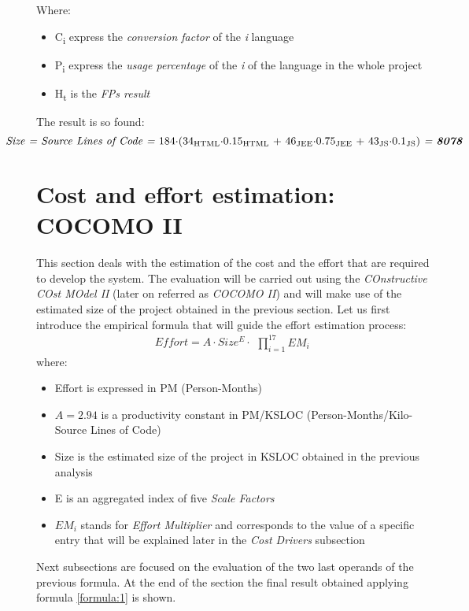 \documentclass[11pt,a4paper]{report}
\begin{document}
Where:
\begin{itemize}
	\item C\textsubscript{i} express the \textit{conversion factor} of the \textit{i} language
	\item P\textsubscript{i}
	express the \textit{usage percentage} of the \textit{i} of the language in the whole project
	\item H\textsubscript{t} is the \textit{FPs result}
\end{itemize}
The result is so found:
\begin{equation}
\centerline{\textit{Size = Source Lines of Code =} $184\cdot$($34\textsubscript{HTML}\cdot$0.15\textsubscript{HTML} + $46\textsubscript{JEE}\cdot$0.75\textsubscript{JEE} + $43\textsubscript{JS}\cdot$0.1\textsubscript{JS}) \textit{= \textbf{8078}}}
\end{equation}
\newpage
\section{Cost and effort estimation: COCOMO II}
This section deals with the estimation of the cost and the effort that are required to develop the system. The evaluation will be carried out using the \textit{COnstructive COst MOdel II} (later on referred as \textit{COCOMO II}) and will make use of the estimated size of the project obtained in the previous section. Let us first introduce the empirical formula that will guide the effort estimation process:
\begin{equation} \label{formula:1}
Effort = A \cdot Size^E \cdot \begin{matrix} \prod_{i=1}^{17} EM_i \end{matrix}
\end{equation}
\noindent where:
\begin{itemize}
	\item Effort is expressed in PM (Person-Months)
	\item $A = 2.94$ is a productivity constant in PM/KSLOC (Person-Months/Kilo-Source Lines of Code)
	\item Size is the estimated size of the project in KSLOC obtained in the previous analysis
	\item E is an aggregated index of five \textit{Scale Factors}
	\item $EM_{i}$ stands for \textit{Effort Multiplier} and corresponds to the value of a specific entry that will be explained later in the \textit{Cost Drivers} subsection
\end{itemize}
Next subsections are focused on the evaluation of the two last operands of the previous formula. At the end of the section the final result obtained applying formula \ref{formula:1} is shown.
\end{document}
